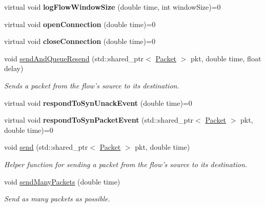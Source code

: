\begin{DoxyCompactItemize}
\item 
\hypertarget{classFlow_a777477d26afb220c96de8495e85e73ef}{virtual void {\bfseries log\-Flow\-Window\-Size} (double time, int window\-Size)=0}\label{classFlow_a777477d26afb220c96de8495e85e73ef}

\item 
\hypertarget{classFlow_aedfba46ffa2ea5e12ed953174d29380f}{virtual void {\bfseries open\-Connection} (double time)=0}\label{classFlow_aedfba46ffa2ea5e12ed953174d29380f}

\item 
\hypertarget{classFlow_a8ebd328c963fef5e538a3d6ea91ee317}{virtual void {\bfseries close\-Connection} (double time)=0}\label{classFlow_a8ebd328c963fef5e538a3d6ea91ee317}

\item 
void \hyperlink{classFlow_a2a9cb972dfe6f6f03543073b575d65c6}{send\-And\-Queue\-Resend} (std\-::shared\-\_\-ptr$<$ \hyperlink{classPacket}{\-Packet} $>$ pkt, double time, float delay)
\begin{DoxyCompactList}\small\item\em \-Sends a packet from the flow's source to its destination. \end{DoxyCompactList}\item 
\hypertarget{classFlow_a3c3884b1b36915274c3c15934f7e6d2a}{virtual void {\bfseries respond\-To\-Syn\-Unack\-Event} (double time)=0}\label{classFlow_a3c3884b1b36915274c3c15934f7e6d2a}

\item 
\hypertarget{classFlow_a1b9f70de92594ba82c5a1b16298f3811}{virtual void {\bfseries respond\-To\-Syn\-Packet\-Event} (std\-::shared\-\_\-ptr$<$ \hyperlink{classPacket}{\-Packet} $>$ pkt, double time)=0}\label{classFlow_a1b9f70de92594ba82c5a1b16298f3811}

\item 
void \hyperlink{classFlow_a5a547ae4185337bf7790f9ace391ac48}{send} (std\-::shared\-\_\-ptr$<$ \hyperlink{classPacket}{\-Packet} $>$ pkt, double time)
\begin{DoxyCompactList}\small\item\em \-Helper function for sending a packet from the flow's source to its destination. \end{DoxyCompactList}\item 
void \hyperlink{classFlow_a792deb9bffc1a4020e09275f037fcc4c}{send\-Many\-Packets} (double time)
\begin{DoxyCompactList}\small\item\em \-Send as many packets as possible. \end{DoxyCompactList}\end{DoxyCompactItemize}
